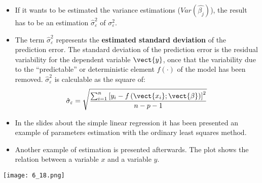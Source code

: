 
\begin{frame}
  \vspace*{.25cm}
  \begin{itemize}
    \item If it wants to be estimated the variance estimations ($ Var(\hat{\beta_{j}}) $), the result has to be an estimation $ \hat{\sigma}^2_{\varepsilon} $ of $ \sigma^2_{\varepsilon} $.
    \vspace{1cm} \item The term $ \hat{\sigma}^2_{\varepsilon} $ represents the \textbf{estimated standard deviation} of the prediction error. The standard deviation of the prediction error is the residual variability for the dependent variable $ \vect{y} $, once that the variability due to the ``predictable'' or deterministic element $ f(\cdot) $ of the model has been removed. $\hat{\sigma}^2_{\varepsilon}$ is calculable as the square of:
      $$ \hat{\sigma}_{\varepsilon} = \sqrt{\frac{\sum_{i=1}^n{\left[ y_i-f\left( \vect{x_i}; \vect{\beta} \right)  \right] ^2 }} {n-p-1}} $$
  \end{itemize}
\end{frame}


\begin{frame}
  \begin{itemize}
    \item In the slides about the simple linear regression it has been presented an example of parameters estimation with the ordinary least squares method.
    \item Another example of estimation is presented afterwards. The plot shows the relation between a variable $ x $ and a variable $ y $.
  \end{itemize}
  \begin{center}
    \texttt{[image: 6\_18.png]}
  \end{center}
\end{frame}

